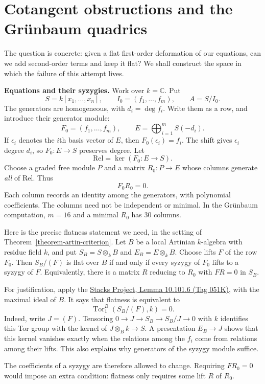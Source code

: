 \section{Cotangent obstructions and
the Gr\"unbaum quadrics}
\label{section-cotangent-quadrics}

\noindent
The question is concrete: given a flat
first-order deformation of our equations,
can we add second-order terms and keep it
flat? We shall construct the space in which
the failure of this attempt lives.

\medskip\noindent
\textbf{Equations and their syzygies.}
Work over $k=\mathbb{C}$. Put
$$
S=k[x_1,\ldots,x_n],\qquad
I_0=(f_1,\ldots,f_m),\qquad A=S/I_0.
$$
The generators are homogeneous, with
$d_i=\deg f_i$. Write them as a row,
and introduce their generator module:
$$
F_0=(f_1,\ldots,f_m),\qquad
E=\bigoplus_{i=1}^m S(-d_i).
$$
If $\epsilon_i$ denotes the $i$th basis
vector of $E$, then $F_0(\epsilon_i)=f_i$.
The shift gives $\epsilon_i$ degree $d_i$,
so $F_0:E\to S$ preserves degree. Let
$$
\mathrm{Rel}=\ker(F_0:E\to S).
$$
Choose a graded free module $P$ and a matrix
$R_0:P\to E$ whose columns generate
\emph{all} of $\mathrm{Rel}$. Thus
$$
F_0R_0=0.
$$
Each column records an identity among the
generators, with polynomial coefficients.
The columns need not be independent or
minimal. In the Gr\"unbaum computation,
$m=16$ and a minimal $R_0$ has 30 columns.

Here is the precise flatness statement we
need, in the setting of
Theorem~\ref{theorem-artin-criterion}.
Let $B$ be a local Artinian $k$-algebra
with residue field $k$, and put
$S_B=S\otimes_k B$ and $E_B=E\otimes_k B$.
Choose lifts $F$ of the row $F_0$. Then
$S_B/(F)$ is flat over $B$ if and only if
every syzygy of $F_0$ lifts to a syzygy of
$F$. Equivalently, there is a matrix $R$
reducing to $R_0$ with $FR=0$ in $S_B$.

For justification, apply the
\href{https://stacks.math.columbia.edu/%
tag/051K}{Stacks Project, Lemma 10.101.6
(Tag 051K)}, with the maximal ideal of $B$.
It says that flatness is equivalent to
$$
\operatorname{Tor}^B_1(S_B/(F),k)=0.
$$
Indeed, write $J=(F)$. Tensoring
$0\to J\to S_B\to S_B/J\to0$ with $k$
identifies this Tor group with the kernel
of $J\otimes_B k\to S$. A presentation
$E_B\to J$ shows that this kernel vanishes
exactly when the relations among the $f_i$
come from relations among their lifts.
This also explains why generators of the
syzygy module suffice.

The coefficients of a syzygy are therefore
allowed to change. Requiring $FR_0=0$
would impose an extra condition: flatness
only requires some lift $R$ of $R_0$.


